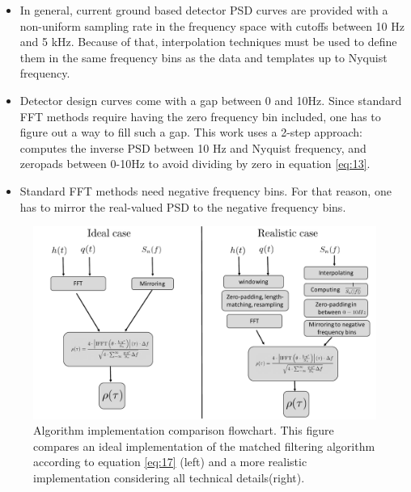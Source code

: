 \begin{itemize}
\begin{itemize}
	\item In general, current ground based detector PSD curves are provided with a non-uniform sampling rate in the frequency space \cite{Reitze:2019dyk} with cutoffs between 10 Hz and 5 kHz. Because of that, interpolation techniques must be used to define them in the same frequency bins as the data and templates up to Nyquist frequency.
	\item Detector design curves come with a gap between 0 and 10Hz. Since standard FFT methods require having the zero frequency bin included, one has to figure out a way to fill such a gap. This work uses a 2-step approach: computes the inverse PSD between 10 Hz and Nyquist frequency, and zeropads between 0-10Hz to avoid dividing by zero in equation \ref{eq:13}.
	\item Standard FFT methods need negative frequency bins. For that reason, one has to mirror the real-valued PSD to the negative frequency bins.
	\end{itemize}

\end{itemize}

\begin{figure}[hbt!]

\begin{center}

\includegraphics[width=\textwidth, angle=0]{images/comparison.pdf}
\captionsetup{width=0.8\textwidth}
\caption[Matched filtering algorithm: ideal vs realistic flowchart]{Algorithm implementation comparison flowchart. This figure compares an ideal implementation of the matched filtering algorithm according to equation \ref{eq:17} (left) and a more realistic implementation considering all technical details(right).}
\label{fig:8}
\end{center}
\end{figure}

\FloatBarrier














